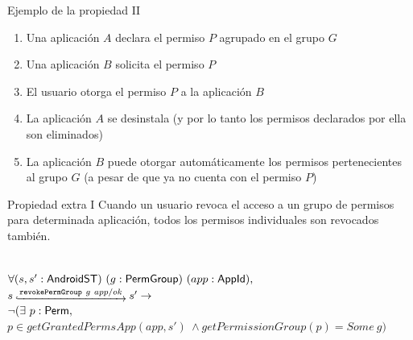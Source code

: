\documentclass[pdf, handout]{beamer} %
\begin{document}
\begin{frame}{Ejemplo de la propiedad II}
    \begin{enumerate}[<+->]
        \item Una aplicación $A$ declara el permiso $P$ agrupado en el grupo $G$
        \item Una aplicación $B$ solicita el permiso $P$
        \item El usuario otorga el permiso $P$ a la aplicación $B$
        \item La aplicación $A$ se desinstala (y por lo tanto los permisos declarados por ella son
              eliminados)
        \item La aplicación $B$ puede otorgar automáticamente los permisos pertenecientes al grupo $G$
              (a pesar de que ya no cuenta con el permiso $P$)
    \end{enumerate}
\end{frame}

\begin{frame}{Propiedad extra I}
    Cuando un usuario revoca el acceso a un grupo de permisos para determinada aplicación, todos los permisos individuales son revocados también.
    \begin{prop} \mbox{} \\
        \fontsize{9pt}{15pt}\selectfont
        $\forall (s,s': \mathsf{AndroidST})~(g:\mathsf{PermGroup})~(app:\mathsf{AppId}),$ \\
        $\Mathexecrel{s}{\texttt{revokePermGroup}~g~app/ok}{s'} \rightarrow$ \\
        $\neg (\exists\ p: \mathsf{Perm},$\\
        \hspace{15px}$p \in getGrantedPermsApp(app,s')\ \land getPermissionGroup(p) = Some\ g)$
    \end{prop}
\end{frame}
\end{document}
